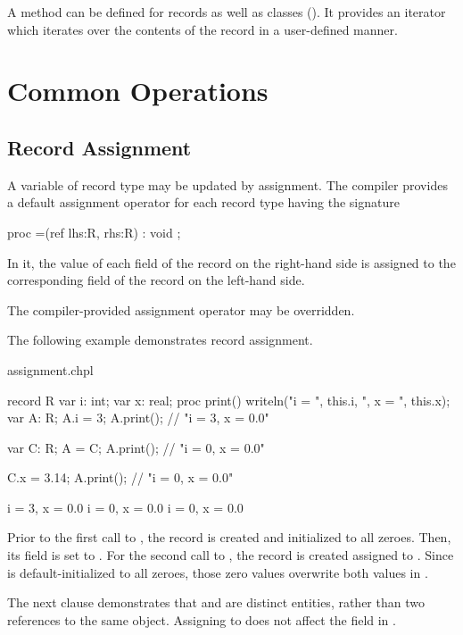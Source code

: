 A  method can be defined for records as well as classes ().  It
provides an iterator which iterates over the contents of the record in a
user-defined manner.

\section{Common Operations}

\subsection{Record Assignment}
\label{Record_Assignment}

A variable of record type may be updated by assignment.  The compiler provides
a default assignment operator for each record type  having the signature
\begin{example}
\begin{chapel}
proc =(ref lhs:R, rhs:R) : void ;
\end{chapel}
\end{example}
\noindent
In it, the value of each field of the record on the right-hand side is assigned
to the corresponding field of the record on the left-hand side.

The compiler-provided assignment operator may be overridden.

The following example demonstrates record assignment.
\begin{chapelexample}{assignment.chpl}
\begin{chapel}
record R {
  var i: int;
  var x: real;
  proc print() { writeln("i = ", this.i, ", x = ", this.x); }
}
var A: R;
A.i = 3;
A.print();	// "i = 3, x = 0.0"

var C: R;
A = C;
A.print();	// "i = 0, x = 0.0"

C.x = 3.14;
A.print();	// "i = 0, x = 0.0"
\end{chapel}
\begin{chapeloutput}
i = 3, x = 0.0
i = 0, x = 0.0
i = 0, x = 0.0
\end{chapeloutput}
Prior to the first call to , the record  is created and
initialized to all zeroes.  Then, its  field is set to .
For the second call to , the record  is created assigned
to .  Since  is default-initialized to all zeroes, those zero
values overwrite both values in .

The next clause demonstrates that  and  are distinct entities,
rather than two references to the same object.  Assigning 
to  does not affect the  field in .
\end{chapelexample}

